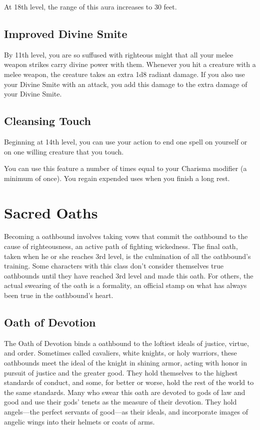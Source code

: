 At 18th level, the range of this aura increases to 30 feet.

\subsection{Improved Divine Smite}

By 11th level, you are so suffused with righteous might that all your melee weapon strikes carry divine power with them. Whenever you hit a creature with a melee weapon, the creature takes an extra 1d8 radiant damage. If you also use your Divine Smite with an attack, you add this damage to the extra damage of your Divine Smite.

\subsection{Cleansing Touch}

Beginning at 14th level, you can use your action to end one spell on yourself or on one willing creature that you touch.

You can use this feature a number of times equal to your Charisma modifier (a minimum of once). You regain expended uses when you finish a long rest.

\section{Sacred Oaths}

Becoming a oathbound involves taking vows that commit the oathbound to the cause of righteousness, an active path of fighting wickedness. The final oath, taken when he or she reaches 3rd level, is the culmination of all the oathbound's training. Some characters with this class don't consider themselves true oathbounds until they have reached 3rd level and made this oath. For others, the actual swearing of the oath is a formality, an official stamp on what has always been true in the oathbound's heart.

\subsection{Oath of Devotion}

The Oath of Devotion binds a oathbound to the loftiest ideals of justice, virtue, and order. Sometimes called cavaliers, white knights, or holy warriors, these oathbounds meet the ideal of the knight in shining armor, acting with honor in pursuit of justice and the greater good. They hold themselves to the highest standards of conduct, and some, for better or worse, hold the rest of the world to the same standards. Many who swear this oath are devoted to gods of law and good and use their gods' tenets as the measure of their devotion. They hold angels—the perfect servants of good—as their ideals, and incorporate images of angelic wings into their helmets or coats of arms.

